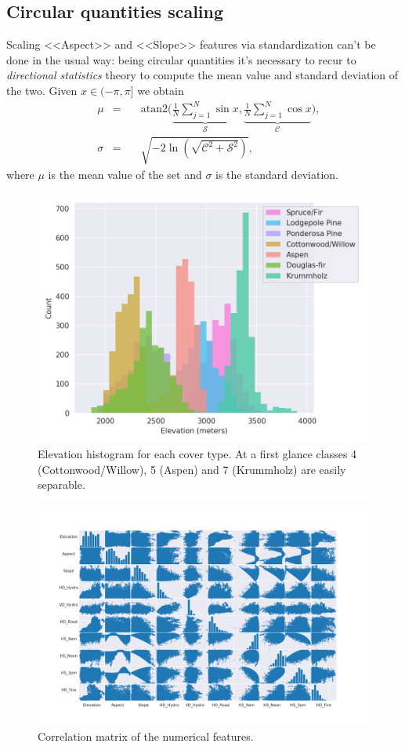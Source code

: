 \subsection{Circular quantities scaling}
Scaling <<Aspect>> and <<Slope>> features via standardization can't be done in the usual way: being circular quantities it's necessary to recur to \textit{directional statistics} theory to compute the mean value and standard deviation of the two. Given $x\in(-\pi,\pi]$ we obtain
\begin{equation}
\begin{aligned}
&\mu&=&\quad\text{atan2}\Bigg(\underbrace{\frac{1}{N}\sum_{j=1}^{N}\sin{x}}_{\mathcal{S}},\underbrace{\frac{1}{N}\sum_{j=1}^{N}\cos{x}}_{\mathcal{C}}\Bigg) \text{,} \\
&\sigma&=&\quad\sqrt{-2\ln\left(\sqrt{\mathcal{C}^2+\mathcal{S}^2}\right)}\text{,}
\end{aligned}
\end{equation}   
where $\mu$ is the mean value of the set and $\sigma$ is the standard deviation.
\begin{figure}
\centering
\includegraphics[width=\textwidth]{./TeX_files/img/elevationhist.png}
\caption{Elevation histogram for each cover type. At a first glance classes 4 (Cottonwood/Willow), 5 (Aspen) and 7 (Krummholz) are easily separable.}
\label{fig:elevationhist}
\end{figure}
\begin{figure}
\centering
\includegraphics[width=\textwidth]{./TeX_files/img/fullcorrmatrix.png}
\caption{Correlation matrix of the numerical features.}
\label{fig:fullcorrmatrix}
\end{figure}